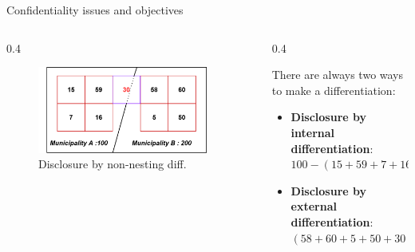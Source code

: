 \documentclass[final,xcolor={dvipsnames,svgnames,table}]{beamer}
\newlength{\sepwidth}
\newlength{\colwidth}
\newcommand{\separatorcolumn}{\begin{column}{\sepwidth}\end{column}}
\begin{document}
\begin{frame}[fragile,t]
\begin{columns}[t]
\begin{column}{\colwidth}
\begin{backblock}{Confidentiality issues and objectives}
\begin{itemize}
\begin{columns}[t]
          \begin{column}{0.4\colwidth}
                     
            \vspace{-1.5cm}
                     
              \begin{figure}
                  \centering
                  \includegraphics[scale=0.67]{Images/carreau_com.png}

                  \vspace{-0.5cm}
                  
                 \caption{Disclosure by non-nesting diff.}
                 
                  \label{fig:my_label}
            \end{figure}
          \end{column}
          
          \separatorcolumn
          
          \begin{column}{0.4\colwidth}
          
          \vspace{1cm}
          
          There are always two ways to make a differentiation:
              \begin{itemize}
                \item \textbf{Disclosure by internal differentiation}: $100 - (15+59+7+16) = 3$ 
                \item \textbf{Disclosure by external differentiation}: $(58+60+5+50+30) - 200 = 3$
            \end{itemize}
          \end{column}


\end{columns}
\end{itemize}
\end{backblock}
\end{column}
\end{columns}
\end{frame}
\end{document}

